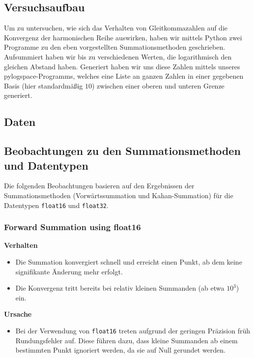 \documentclass{scrartcl}
\begin{document}
\subsection{Versuchsaufbau}
Um zu untersuchen, wie sich das Verhalten von Gleitkommazahlen auf die
Konvergenz der harmonischen Reihe auswirken, haben wir mittels Python zwei
Programme zu den eben vorgestellten Summationsmethoden geschrieben. Aufsummiert
haben wir bis zu verschiedenen Werten, die logarithmisch den gleichen Abstand
haben. Generiert haben wir uns diese Zahlen mittels unseres
pylogspace-Programms, welches eine Liste an ganzen Zahlen in einer gegebenen
Basis (hier standardmäßig \(10\)) zwischen einer oberen und unteren Grenze
generiert.

\subsection{Daten}

\begin{center}
\end{center}

\subsection{Beobachtungen zu den Summationsmethoden und Datentypen}

Die folgenden Beobachtungen basieren auf den Ergebnissen der Summationsmethoden
(Vorwärtssummation und Kahan-Summation) für die Datentypen \texttt{float16} und
\texttt{float32}.

\subsubsection{Forward Summation using float16}

\textbf{Verhalten}
\begin{itemize}
    \item Die Summation konvergiert schnell und erreicht einen Punkt, ab dem
          keine signifikante Änderung mehr erfolgt.
    \item Die Konvergenz tritt bereits bei relativ kleinen Summanden (ab etwa
          \(10^3\)) ein.
\end{itemize}

\textbf{Ursache}
\begin{itemize}
    \item Bei der Verwendung von \texttt{float16} treten aufgrund der geringen
          Präzision früh Rundungsfehler auf. Diese führen dazu, dass kleine
          Summanden ab einem bestimmten Punkt ignoriert werden, da sie auf Null
          gerundet werden.
\end{itemize}
\end{document}
